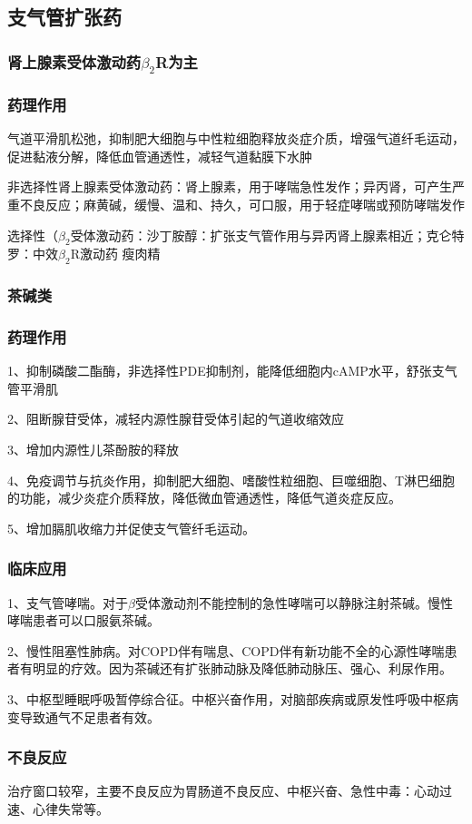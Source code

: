 \documentclass[UTF8]{ctexbook}
\begin{document}
\subsection{支气管扩张药}
\subsubsection{肾上腺素受体激动药\(\beta_{2}\)R为主}
\subsubsection{药理作用}
气道平滑肌松弛，抑制肥大细胞与中性粒细胞释放炎症介质，增强气道纤毛运动，促进黏液分解，降低血管通透性，减轻气道黏膜下水肿

非选择性肾上腺素受体激动药：肾上腺素，用于哮喘急性发作；异丙肾，可产生严重不良反应；麻黄碱，缓慢、温和、持久，可口服，用于轻症哮喘或预防哮喘发作

选择性（\(\beta_{2}\)受体激动药：沙丁胺醇：扩张支气管作用与异丙肾上腺素相近；克仑特罗：中效\(\beta_{2}\)R激动药 瘦肉精

\subsubsection{茶碱类}
\subsubsection{药理作用}
1、抑制磷酸二酯酶，非选择性PDE抑制剂，能降低细胞内cAMP水平，舒张支气管平滑肌

2、阻断腺苷受体，减轻内源性腺苷受体引起的气道收缩效应

3、增加内源性儿茶酚胺的释放

4、免疫调节与抗炎作用，抑制肥大细胞、嗜酸性粒细胞、巨噬细胞、T淋巴细胞的功能，减少炎症介质释放，降低微血管通透性，降低气道炎症反应。

5、增加膈肌收缩力并促使支气管纤毛运动。
\subsubsection{临床应用}
1、支气管哮喘。对于\(\beta\)受体激动剂不能控制的急性哮喘可以静脉注射茶碱。慢性哮喘患者可以口服氨茶碱。

2、慢性阻塞性肺病。对COPD伴有喘息、COPD伴有新功能不全的心源性哮喘患者有明显的疗效。因为茶碱还有扩张肺动脉及降低肺动脉压、强心、利尿作用。

3、中枢型睡眠呼吸暂停综合征。中枢兴奋作用，对脑部疾病或原发性呼吸中枢病变导致通气不足患者有效。
\subsubsection{不良反应}
治疗窗口较窄，主要不良反应为胃肠道不良反应、中枢兴奋、急性中毒：心动过速、心律失常等。
\end{document}
